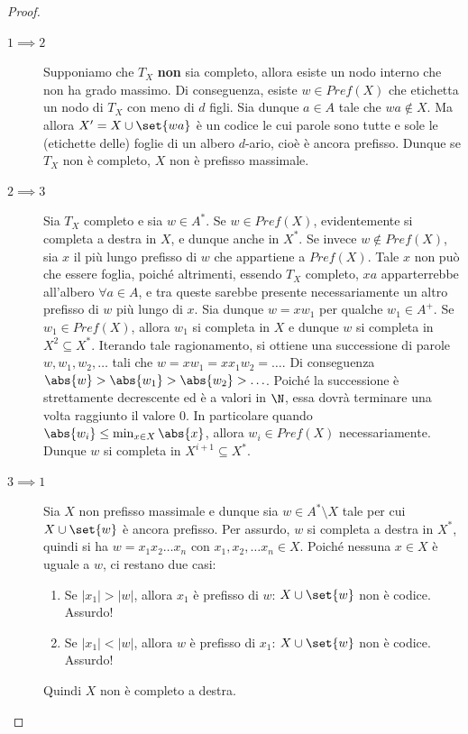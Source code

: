 \begin{proof}
  \begin{description}
    \item[\(1 \implies 2\)]
      Supponiamo che \(T_X\) \textbf{non} sia completo, allora esiste un nodo interno che non ha grado massimo.
      Di conseguenza, esiste \(w \in Pref(X)\) che etichetta un nodo di \(T_X\) con meno di \(d\) figli.
      Sia dunque \(a \in A\) tale che \(wa \not\in X\). Ma allora \(X' = X \cup \set{wa}\) è un codice le cui parole sono tutte e sole le (etichette delle) foglie di un albero \(d\)-ario, cioè è ancora prefisso.
      Dunque se \(T_X\) non è completo, \(X\) non è prefisso massimale.
    \item[\(2 \implies 3\)]
      Sia \(T_X\) completo e sia \(w \in A^*\). Se \(w \in Pref(X)\), evidentemente si completa a destra in \(X\), e dunque anche in \(X^*\).
      Se invece \(w \not\in Pref(X)\), sia \(x\) il più lungo prefisso di \(w\) che appartiene a \(Pref(X)\).
      Tale \(x\) non può che essere foglia, poiché altrimenti, essendo \(T_X\) completo, \(xa\) apparterrebbe all'albero \(\forall a \in A\), e tra queste sarebbe presente necessariamente un altro prefisso di \(w\) più lungo di \(x\).
      Sia dunque \(w=xw_1\) per qualche \(w_1 \in A^+\). Se \(w_1\in Pref(X)\), allora \(w_1\) si completa in \(X\) e dunque \(w\) si completa in \(X^2\subseteq X^*\).
      Iterando tale ragionamento, si ottiene una successione di parole \(w, w_1, w_2, \ldots\) tali che \(w = x w_1 = x x_1 w_2 = \ldots\).
      Di conseguenza \(\abs{w} > \abs{w_1} > \abs{w_2} > \ldots\). Poiché la successione è strettamente decrescente ed è a valori in $\N$, essa dovrà terminare una volta raggiunto il valore $0$.
      In particolare quando \(\abs{w_i}\leq \min_{x\in X}\abs{x}\), allora \(w_i \in Pref(X)\) necessariamente.
      Dunque \(w\) si completa in \(X^{i+1} \subseteq X^*\).
    \item[\(3 \implies 1\)]
      Sia \(X\) non prefisso massimale e dunque sia \(w \in A^*\setminus X\) tale per cui \(X \cup \set{w}\) è ancora prefisso.
      Per assurdo, $w$ si completa a destra in $X^{*}$, quindi si ha $w=x_{1}x_{2}\ldots x_{n}$ con $x_{1},x_{2},\ldots x_n \in X$. Poiché nessuna $x \in X$ è uguale a $w$, ci restano due casi: 
      \begin{enumerate}
        \item Se $|x_{1}|>|w|$, allora $x_{1}$ è prefisso di $w$: $X\cup \set{w}$ non è codice. Assurdo!
        \item Se $|x_{1}|<|w|$, allora $w$ è prefisso di $x_{1}$: $X\cup \set{w}$ non è codice. Assurdo!
      \end{enumerate}
      Quindi $X$ non è completo a destra.
  \end{description}
\end{proof}

